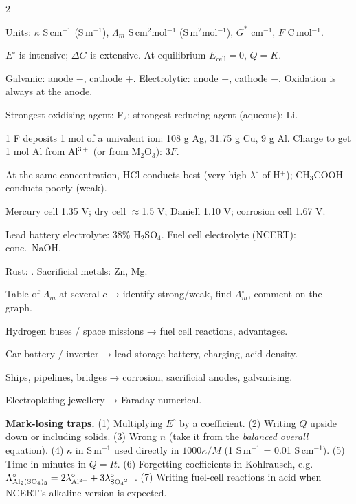 \documentclass[10pt,a4paper]{extarticle}
\begin{document}
\begin{multicols}{2}
\begin{fl}
\item Units: $\kappa$ S\,cm$^{-1}$ (S\,m$^{-1}$), $\Lambda_m$ S\,cm$^2$mol$^{-1}$ (S\,m$^2$mol$^{-1}$), $G^*$ cm$^{-1}$, $F$ C\,mol$^{-1}$. \SQP
\item $E^\circ$ is intensive; $\Delta G$ is extensive. At equilibrium $E_\text{cell}=0$, $Q=K$.
\item Galvanic: anode $-$, cathode $+$. Electrolytic: anode $+$, cathode $-$. Oxidation is always at the anode.
\item Strongest oxidising agent: F$_2$; strongest reducing agent (aqueous): Li.
\item 1 F deposits 1 mol of a univalent ion: 108 g Ag, 31.75 g Cu, 9 g Al. Charge to get 1 mol Al from Al$^{3+}$ (or from M$_2$O$_3$): $3F$. \SQP
\item At the same concentration, HCl conducts best (very high $\lambda^\circ$ of H$^+$); CH$_3$COOH conducts poorly (weak). \SQP
\item Mercury cell 1.35 V; dry cell $\approx$1.5 V; Daniell 1.10 V; corrosion cell 1.67 V.
\item Lead battery electrolyte: 38\% H$_2$SO$_4$. Fuel cell electrolyte (NCERT): conc.\ NaOH. \SQP
\item Rust: . Sacrificial metals: Zn, Mg.
\end{fl}

\begin{fl}
\item Table of $\Lambda_m$ at several $c$ → identify strong/weak, find $\Lambda^\circ_m$, comment on the graph.
\item Hydrogen buses / space missions → fuel cell reactions, advantages.
\item Car battery / inverter → lead storage battery, charging, acid density.
\item Ships, pipelines, bridges → corrosion, sacrificial anodes, galvanising.
\item Electroplating jewellery → Faraday numerical.
\end{fl}

\begin{tip}\Tip \textbf{Mark-losing traps.} (1) Multiplying $E^\circ$ by a coefficient. (2) Writing $Q$ upside down or including solids. (3) Wrong $n$ (take it from the \emph{balanced overall} equation). (4) $\kappa$ in S\,m$^{-1}$ used directly in $1000\kappa/M$ (1 S\,m$^{-1}$ = 0.01 S\,cm$^{-1}$). (5) Time in minutes in $Q=It$. (6) Forgetting coefficients in Kohlrausch, e.g.\ $\Lambda^\circ_{\ce{Al2(SO4)3}}=2\lambda^\circ_{\ce{Al^3+}}+3\lambda^\circ_{\ce{SO4^2-}}$. (7) Writing fuel-cell reactions in acid when NCERT's alkaline version is expected.\end{tip}
\end{multicols}
\begin{tcolorbox}[enhanced,colback=white,colframe=uc,boxrule=0.6pt,arc=2pt,title={\sffamily\bfseries\footnotesize My notes — Ch 2 Electrochemistry},colbacktitle=uc,coltitle=white,height fill,before skip=4pt]
\end{tcolorbox}
\end{document}

